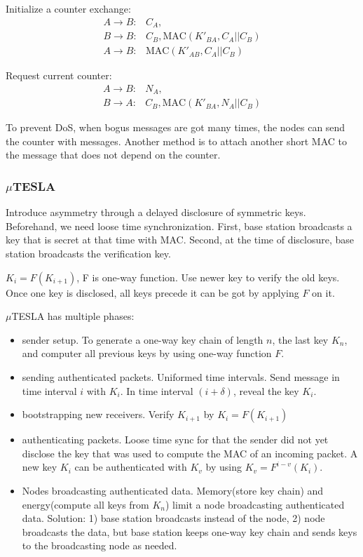 \documentclass[]{article}
\begin{document}
Initialize a counter exchange:
\begin{align*}
A \rightarrow B:& C_A,\\
B \rightarrow B:& C_B, \text{MAC}(K'_{BA}, C_A||C_B)\\
A \rightarrow B:& \text{MAC}(K'_{AB}, C_A||C_B)
\end{align*}

Request current counter:
\begin{align*}
A \rightarrow B:& N_A,\\
B \rightarrow A:& C_B, \text{MAC}(K'_{BA}, N_A||C_B)
\end{align*}

To prevent DoS, when bogus messages are got many times, the nodes
can send the counter with messages. Another method is to attach another
short MAC to the message that does not depend on the counter.

\subsubsection{$\mu$TESLA}
Introduce asymmetry through a delayed disclosure of symmetric keys.
Beforehand, we need loose time synchronization. First, base station 
broadcasts a key that is secret at that time with MAC. Second, at the time
of disclosure, base station broadcasts the verification key.

$K_i = F(K_{i+1})$, F is one-way function. Use newer key to verify the old
keys. Once one key is disclosed, all keys precede it can be got by applying
$F$ on it.

$\mu$TESLA has multiple phases: 
\begin{itemize}
 \item sender setup. To generate a one-way key chain of length $n$, the 
 last key $K_n$, and computer all previous keys by using one-way function
 $F$.
 \item sending authenticated packets. Uniformed time intervals. Send message
 in time interval $i$ with $K_i$. In time interval $(i + \delta)$, reveal the key
 $K_i$.
 \item bootstrapping new receivers. Verify $K_{i+1}$ by $K_i = F(K_{i+1})$
 \item authenticating packets. Loose time sync for that the sender did not 
 yet disclose the key that was used to compute the MAC of an incoming
 packet. A new key $K_i$ can be authenticated with $K_v$ by using 
 $K_v = F^{i-v}(K_i)$.
 \item Nodes broadcasting authenticated data. Memory(store key chain) and
  energy(compute all keys from $K_n$) limit  a node broadcasting 
  authenticated data. Solution: 1) base station broadcasts
 instead of the node, 2) node broadcasts the data, but base station keeps
 one-way key chain and sends keys to the broadcasting node as needed.
\end{itemize}
\end{document}

